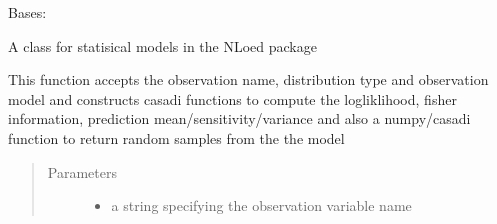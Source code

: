 \documentclass[letterpaper,10pt,english,openany,oneside]{sphinxmanual}
\begin{document}
\begin{fulllineitems}
\label{\detokenize{nloed:nloed.model.Model}}
Bases: 

A class for statisical models in the NLoed package

\begin{fulllineitems}
\label{\detokenize{nloed:nloed.model.Model.distribution_dict}}
\end{fulllineitems}


\begin{fulllineitems}
\label{\detokenize{nloed:nloed.model.Model._get_distribution_functions}}
This function accepts the observation name, distribution type
and observation model and constructs casadi functions to compute
the logliklihood, fisher information, prediction mean/sensitivity/variance
and also a numpy/casadi function to return random samples from the the model
\begin{quote}\begin{description}
\item[{Parameters}] \leavevmode\begin{itemize}
\item {} 
 \textendash{} a string specifying the observation variable name


\end{itemize}
\end{description}
\end{quote}
\end{fulllineitems}
\end{fulllineitems}
\end{document}
